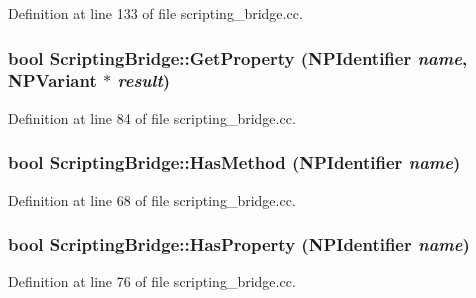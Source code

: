 Definition at line 133 of file scripting\_\-bridge.cc.

\hypertarget{classtumbler_1_1_scripting_bridge_afef889fc2ff5ccabefb713cf7ad5e056}{
\subsubsection[{GetProperty}]{\setlength{\rightskip}{0pt plus 5cm}bool ScriptingBridge::GetProperty (NPIdentifier {\em name}, \/  NPVariant $\ast$ {\em result})}}
\label{classtumbler_1_1_scripting_bridge_afef889fc2ff5ccabefb713cf7ad5e056}


Definition at line 84 of file scripting\_\-bridge.cc.

\hypertarget{classtumbler_1_1_scripting_bridge_a1d614bb3696baef7c46332426ab7a0dc}{
\subsubsection[{HasMethod}]{\setlength{\rightskip}{0pt plus 5cm}bool ScriptingBridge::HasMethod (NPIdentifier {\em name})}}
\label{classtumbler_1_1_scripting_bridge_a1d614bb3696baef7c46332426ab7a0dc}


Definition at line 68 of file scripting\_\-bridge.cc.

\hypertarget{classtumbler_1_1_scripting_bridge_aeed261c756896802f26632acfceba1d7}{
\subsubsection[{HasProperty}]{\setlength{\rightskip}{0pt plus 5cm}bool ScriptingBridge::HasProperty (NPIdentifier {\em name})}}
\label{classtumbler_1_1_scripting_bridge_aeed261c756896802f26632acfceba1d7}


Definition at line 76 of file scripting\_\-bridge.cc.

